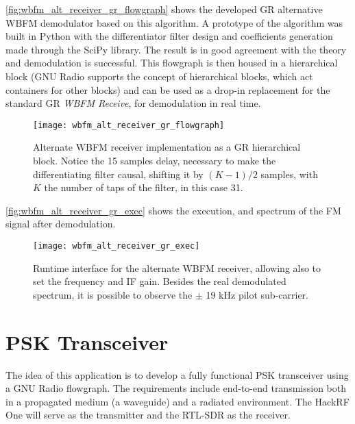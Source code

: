 \autoref{fig:wbfm_alt_receiver_gr_flowgraph} shows the developed GR alternative WBFM demodulator based on this algorithm. A prototype of the algorithm was built in Python with the differentiator filter design and coefficients generation made through the SciPy library. The result is in good agreement with the theory and demodulation is successful. This flowgraph is then housed in a hierarchical block (GNU Radio supports the concept of hierarchical blocks, which act containers for other blocks) and can be used as a drop-in replacement for the standard GR \emph{WBFM Receive}, for demodulation in real time.

\begin{figure}[H]
  \centering
  \texttt{[image: wbfm\_alt\_receiver\_gr\_flowgraph]}
  \caption[Alternate WBFM receiver implementation as a GR hierarchical block]{Alternate WBFM receiver implementation as a GR hierarchical block. Notice the 15 samples delay, necessary to make the differentiating filter causal, shifting it by $(K-1)/2$ samples, with $K$ the number of taps of the filter, in this case 31.}
  \label{fig:wbfm_alt_receiver_gr_flowgraph}
\end{figure}

\autoref{fig:wbfm_alt_receiver_gr_exec} shows the execution, and spectrum of the FM signal after demodulation.

\begin{figure}[H]
  \centering
  \texttt{[image: wbfm\_alt\_receiver\_gr\_exec]}
  \caption[Runtime interface for the alternate WBFM receiver]{Runtime interface for the alternate WBFM receiver, allowing also to set the frequency and IF gain. Besides the real demodulated spectrum, it is possible to observe the $\pm$ 19 kHz pilot sub-carrier.}
  \label{fig:wbfm_alt_receiver_gr_exec}
\end{figure}

\section{PSK Transceiver}
\label{sect:psk_transceiver}

The idea of this application is to develop a fully functional PSK transceiver using a GNU Radio flowgraph. The requirements include end-to-end transmission both in a propagated medium (a waveguide) and a radiated environment. The HackRF One will serve as the transmitter and the RTL-SDR as the receiver.

